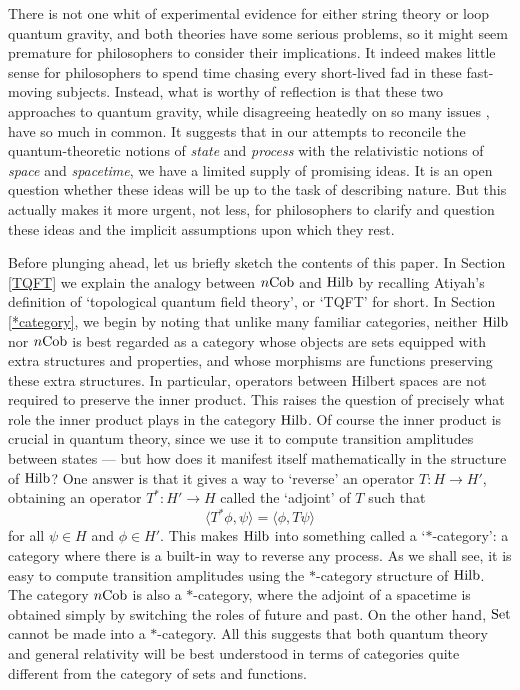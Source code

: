 \documentclass[12pt]{article}
\newcommand{\Set}{{\rm Set}}
\newcommand{\Hilb}{{\rm Hilb}}
\newcommand{\Cob}{{\rm Cob}}
\renewcommand{\to}{\rightarrow}
\newcommand{\maps}{\colon}
\begin{document}
There is not one whit of experimental evidence for either string
theory or loop quantum gravity, and both theories have some
serious problems, so it might seem premature for philosophers to 
consider their implications.  It
indeed makes little sense for philosophers to spend time chasing every
short-lived fad in these fast-moving subjects.  Instead, what is
worthy of reflection is that these two approaches to quantum gravity,
while disagreeing heatedly on so many issues \cite{Smolin,Vaas}, have
so much in common.  It suggests that in our attempts to reconcile the
quantum-theoretic notions of {\it state} and {\it process} with the
relativistic notions of {\it space} and {\it spacetime}, we have a
limited supply of promising ideas.  It is an open question whether
these ideas will be up to the task of describing nature.  But this
actually makes it more urgent, not less, for philosophers to clarify
and question these ideas and the implicit assumptions upon which they
rest.

Before plunging ahead, let us briefly sketch the contents of this
paper.  In Section \ref{TQFT} we explain the analogy between $n\Cob$
and $\Hilb$ by recalling Atiyah's definition of `topological quantum
field theory', or `TQFT' for short.  In Section \ref{*category}, we
begin by noting that unlike many familiar categories, neither $\Hilb$
nor $n\Cob$ is best regarded as a category whose objects are sets
equipped with extra structures and properties, and whose morphisms are
functions preserving these extra structures.  In particular, operators
between Hilbert spaces are not required to preserve the inner product.
This raises the question of precisely what role the inner product
plays in the category $\Hilb$.  Of course the inner product is crucial
in quantum theory, since we use it to compute transition amplitudes
between states --- but how does it manifest itself mathematically in the
structure of $\Hilb$?  One answer is that it gives a way to `reverse'
an operator $T \maps H \to H'$, obtaining an operator 
$T^\ast \maps H' \to H$ called the `adjoint' of $T$ such that
\[   \langle T^\ast \phi,\psi \rangle = \langle \phi, T\psi \rangle \]
for all $\psi \in H$ and $\phi \in H'$.
This makes $\Hilb$ into something called a `$\ast$-category': a
category where there is a built-in way to reverse any process.  As we
shall see, it is easy to compute transition amplitudes using the
$\ast$-category structure of $\Hilb$.  The category $n\Cob$
is also a $\ast$-category, where the adjoint of a spacetime is
obtained simply by switching the roles of future and past.  On the
other hand, $\Set$ cannot be made into a $\ast$-category.  All this
suggests that both quantum theory and general relativity will be best
understood in terms of categories quite different from the category of
sets and functions.
 
\end{document}
